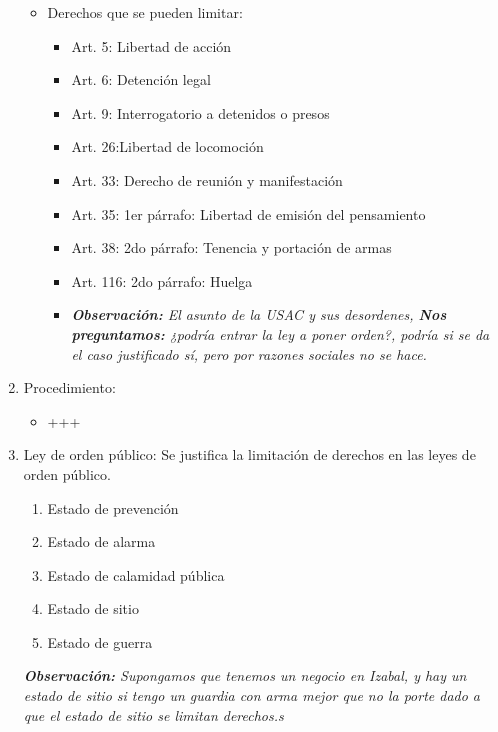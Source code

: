 \begin{enumerate}
\begin{itemize}
            
            \item Derechos que se pueden limitar:
                \begin{itemize}
                    \item Art. 5: Libertad de acción
                    \item Art. 6: Detención legal
                    \item Art. 9: Interrogatorio a detenidos o presos 
                    \item Art. 26:Libertad de locomoción
                    \item Art. 33: Derecho de reunión y manifestación 
                    \item Art. 35: 1er párrafo: Libertad de emisión del pensamiento
                    \item Art. 38: 2do párrafo: Tenencia y portación de armas 
                    \item Art. 116: 2do párrafo: Huelga 
                    \item \emph{\textbf{Observación: }El asunto de la USAC y sus desordenes, \textbf{Nos preguntamos:} ¿podría entrar la ley a poner orden?, podría si se da el caso justificado sí, pero por razones sociales no se hace.} 
                \end{itemize}
        \end{itemize}


        
        \item   Procedimiento: 
            \begin{itemize}
                \item +++
            \end{itemize}

        
        
        \item Ley de orden público: Se justifica la limitación de derechos en las leyes de orden público.
            \begin{enumerate}
                \item Estado de prevención 
                \item Estado de alarma 
                \item Estado de calamidad pública 
                \item Estado de sitio 
                \item Estado de guerra
            \end{enumerate}
            \emph{\textbf{Observación: }Supongamos que tenemos un negocio en Izabal, y hay un estado de sitio si tengo un guardia con arma mejor que no la porte dado a que el estado de sitio se limitan derechos.s }
            
        
\end{enumerate}

